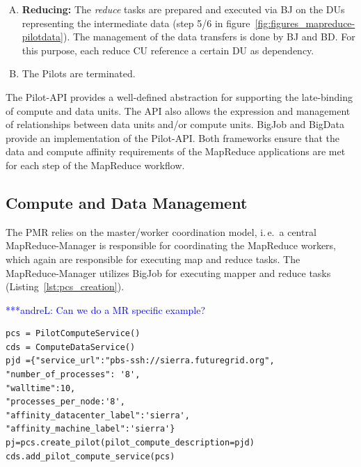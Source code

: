 \documentclass{acm_proc_article-sp}
\newcommand{\alnote}[1]{ {\textcolor{blue} { ***andreL: #1 }}}
\newcommand{\alnote}[1]{}
\newcommand{\pilots}{Pilots\xspace}
\begin{document}
\begin{enumerate}[A.]
		
	
	\item \textbf{Reducing:} The {\it reduce} tasks are prepared and 
	executed via BJ on the DUs representing the intermediate data (step 5/6 in 
	figure~\ref{fig:figures_mapreduce-pilotdata}). 
	The management of the data transfers is done by BJ and BD. For this purpose, 
	each reduce CU reference a certain DU as dependency.
	
	\item The \pilots are terminated.

\end{enumerate}

The Pilot-API provides a well-defined abstraction for supporting the
late-binding of compute and data units. The API also allows the expression and
management of relationships between data units and/or compute units. BigJob
and BigData provide an implementation of the Pilot-API. Both frameworks ensure
that the data and compute affinity requirements of the MapReduce applications
are met for each step of the MapReduce workflow.

\subsection{Compute and Data Management}
The PMR relies on the master/worker
coordination model, i.\,e.\ a central MapReduce-Manager is responsible for
coordinating the MapReduce workers, which again are responsible for executing
map and reduce tasks. The MapReduce-Manager utilizes BigJob for executing
mapper and reduce tasks (Listing~\ref{lst:pcs_creation}). 

\alnote{Can we do a MR specific example?}

\lstset{
language=Python,
frame=single,
captionpos=b,
stringstyle=\ttfamily,
basicstyle=\scriptsize\ttfamily
}
\noindent\begin{minipage}{0.47 \textwidth}
\begin{lstlisting}[caption={\textbf{Pilot Compute Creation:} Instantiation of a Pilot Job using Pilot Compute Description}, label={lst:pcs_creation}]
pcs = PilotComputeService()
cds = ComputeDataService()
pjd ={"service_url":"pbs-ssh://sierra.futuregrid.org", 
"number_of_processes": '8',
"walltime":10, 
"processes_per_node:'8',
"affinity_datacenter_label":'sierra',
"affinity_machine_label":'sierra'}
pj=pcs.create_pilot(pilot_compute_description=pjd)
cds.add_pilot_compute_service(pcs)
\end{lstlisting}
\end{minipage}
\end{document}
